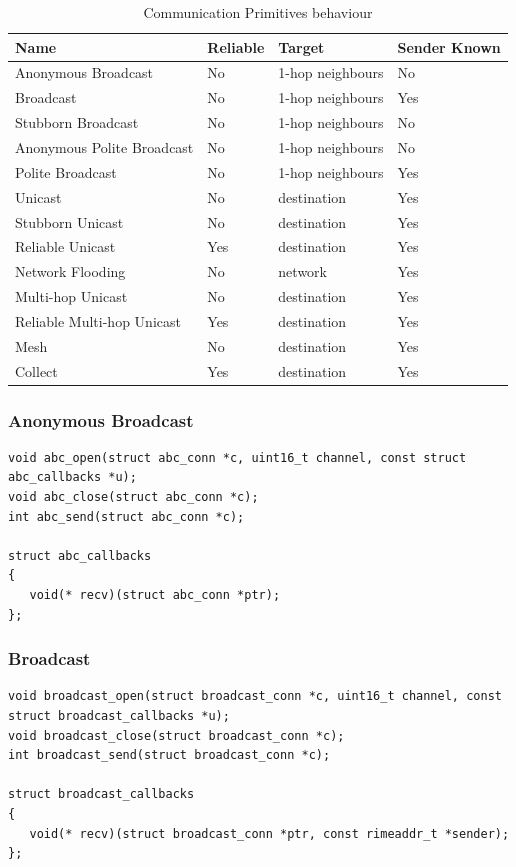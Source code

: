 \begin{table}[H]
	\centering
	\begin{tabular}{ | l | l | l | l | }
		\hline
		Name & Reliable & Target & Sender Known\\
		\hline
		Anonymous Broadcast & No & 1-hop neighbours & No\\
		Broadcast & No & 1-hop neighbours & Yes\\
		Stubborn Broadcast & No & 1-hop neighbours & No\\
		Anonymous Polite Broadcast & No & 1-hop neighbours & No\\
		Polite Broadcast & No & 1-hop neighbours & Yes\\
		Unicast & No & destination & Yes\\
		Stubborn Unicast & No & destination & Yes\\
		Reliable Unicast & Yes & destination & Yes\\
		Network Flooding & No & network & Yes\\
		Multi-hop Unicast & No & destination & Yes\\
		Reliable Multi-hop Unicast & Yes & destination & Yes\\
		\hline
		\hline
		Mesh & No & destination & Yes \\
		Collect & Yes & destination & Yes \\
		\hline
	\end{tabular}
	\caption{Communication Primitives behaviour}
\end{table}

\subsubsection{Anonymous Broadcast}

\begin{verbatim}
void abc_open(struct abc_conn *c, uint16_t channel, const struct abc_callbacks *u);
void abc_close(struct abc_conn *c);
int abc_send(struct abc_conn *c);

struct abc_callbacks
{
   void(* recv)(struct abc_conn *ptr);
};
\end{verbatim}


\subsubsection{Broadcast}

\begin{verbatim}
void broadcast_open(struct broadcast_conn *c, uint16_t channel, const struct broadcast_callbacks *u);
void broadcast_close(struct broadcast_conn *c);
int broadcast_send(struct broadcast_conn *c);

struct broadcast_callbacks
{
   void(* recv)(struct broadcast_conn *ptr, const rimeaddr_t *sender);
};
\end{verbatim}


